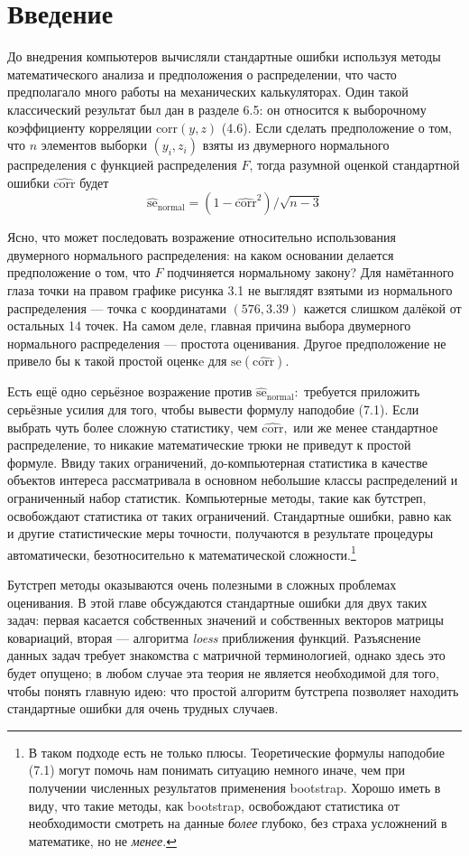\section{Введение}

До внедрения компьютеров вычисляли стандартные ошибки используя методы математического анализа и предположения о распределении, что часто предполагало много работы на механических калькуляторах. Один такой классический результат был дан в разделе 6.5: он относится к выборочному коэффициенту корреляции $\widehat{\text{corr}}(y,z)$ (4.6). Если сделать предположение о том, что $n$ элементов выборки $(y_i,z_i)$ взяты из двумерного нормального распределения с функцией распределения $F$, тогда разумной оценкой стандартной ошибки $\widehat{\text{corr}}$ будет
\begin{equation}
	\widehat{\text{se}}_\text{normal} = (1 - \widehat{\text{corr}}^2)/\sqrt{n-3}
\end{equation}

Ясно, что может последовать возражение относительно использования двумерного нормального распределения: на каком основании делается предположение о том, что $F$ подчиняется нормальному закону? Для намётанного глаза точки на правом графике рисунка 3.1 не выглядят взятыми из нормального распределения --- точка с координатами $(576, 3.39)$ кажется слишком далёкой от остальных 14 точек. На самом деле, главная причина выбора двумерного нормального распределения --- простота оценивания. Другое предположение не привело бы к такой простой оценкe для $\text{se}(\widehat{\text{corr}})$.

Есть ещё одно серьёзное возражение против 
$
\widehat{\text{se}}_\text{normal}:
$
требуется приложить серьёзные усилия для того, чтобы вывести формулу наподобие (7.1). Если выбрать чуть более сложную статистику, чем $\widehat{\text{corr}},$ или же менее стандартное распределение, то никакие математические трюки не приведут к простой формуле. Ввиду таких ограничений, до-компьютерная статистика в качестве объектов интереса рассматривала  в основном небольшие классы распределений и ограниченный набор статистик. Компьютерные методы, такие как бутстреп, освобождают статистика от таких ограничений. Стандартные ошибки, равно как и другие статистические меры точности, получаются в результате процедуры автоматически, безотносительно к математической сложности.\footnote{В таком подходе есть не только плюсы. Теоретические формулы наподобие (7.1) могут помочь нам понимать ситуацию немного иначе, чем при получении численных результатов применения bootstrap. Хорошо иметь в виду, что такие методы, как bootstrap, освобождают статистика от необходимости смотреть на данные \textit{более} глубоко, без страха усложнений в математике, но не \textit{менее}.}

Бутстреп методы оказываются очень полезными в сложных проблемах оценивания. В этой главе обсуждаются стандартные ошибки для двух таких задач: первая касается собственных значений и собственных векторов матрицы ковариаций, вторая --- алгоритма \textit{loess} приближения функций. Разъяснение данных задач требует знакомства с матричной терминологией, однако здесь это будет опущено; в любом случае эта теория не является необходимой для того, чтобы понять главную идею: что простой алгоритм бутстрепа позволяет находить стандартные ошибки для очень трудных случаев.
 